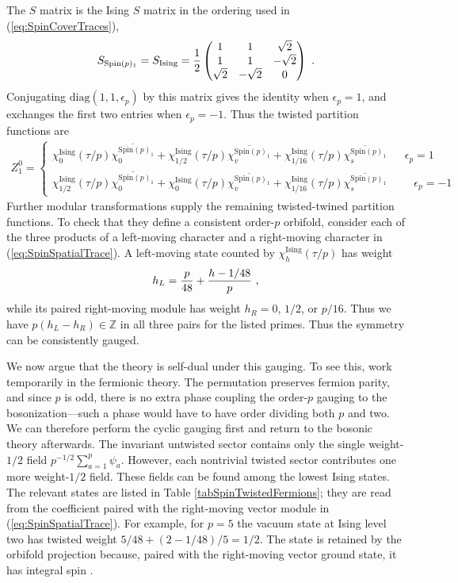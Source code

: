 \documentclass[12pt]{article}
\numberwithin{equation}{section}
\newcommand{\bea}{\begin{eqnarray}}
\newcommand{\eea}{\end{eqnarray}}
\def\ZZ{\mathbb{Z}}
\theoremstyle{remark}
\begin{document}
The $S$ matrix is the Ising $S$ matrix in the ordering used in (\ref{eq:SpinCoverTraces}),
\bea
S_{\mathrm{Spin}(p)_1}=S_{\mathrm{Ising}}
={1\over 2}\begin{pmatrix}1&1&\sqrt2\\1&1&-\sqrt2\\\sqrt2&-\sqrt2&0\end{pmatrix}~.
\eea
Conjugating $\mathrm{diag}(1,1,\epsilon_p)$ by this matrix gives the identity when $\epsilon_p=1$, and exchanges the first two entries when $\epsilon_p=-1$. Thus  the twisted partition functions are
\bea \label{eq:SpinSpatialTrace}
Z^0_1=\left\{ \begin{matrix}
 \chi^{\mathrm{Ising}}_0(\tau/p)\overline{\chi^{\mathrm{Spin}(p)_1}_0}+\chi^{\mathrm{Ising}}_{1/2}(\tau/p)\overline{\chi^{\mathrm{Spin}(p)_1}_{v}}+\chi^{\mathrm{Ising}}_{1/16}(\tau/p)\overline{\chi^{\mathrm{Spin}(p)_1}_{s}} && \epsilon_p = 1
 \\
\chi^{\mathrm{Ising}}_{1/2}(\tau/p)\overline{\chi^{\mathrm{Spin}(p)_1}_0}+\chi^{\mathrm{Ising}}_0(\tau/p)\overline{\chi^{\mathrm{Spin}(p)_1}_{v}}+\chi^{\mathrm{Ising}}_{1/16}(\tau/p)\overline{\chi^{\mathrm{Spin}(p)_1}_{s}}&& \,\,\,\,\,\epsilon_p = -1
\end{matrix} \right.\,\,\,\,
\eea
Further modular transformations supply the remaining twisted-twined partition functions. To check that they define a consistent order-$p$ orbifold, consider each of the three products of a left-moving character and a right-moving character in (\ref{eq:SpinSpatialTrace}). A left-moving state counted by $\chi^{\mathrm{Ising}}_h(\tau/p)$ has weight
\bea
h_L={p\over48}+{h-1/48\over p}~,
\eea
while its paired right-moving module has weight $h_R=0$, $1/2$, or $p/16$. Thus we have $p(h_L-h_R)\in\ZZ$ in all three pairs for the listed primes. 
Thus the symmetry can be consistently gauged.

We now argue that the theory is self-dual under this gauging. To see this, work temporarily in the fermionic theory. The permutation preserves fermion parity, and since $p$ is odd, there is no extra phase coupling the order-$p$ gauging to the bosonization---such a phase would have to have order dividing both $p$ and two. We can therefore perform the cyclic gauging first and return to the bosonic theory afterwards. The invariant untwisted sector contains only the single weight-$1/2$ field $p^{-1/2}\sum_{a=1}^p\psi_a$. However, each nontrivial twisted sector contributes one more weight-$1/2$ field. These fields can be found among the lowest Ising states. The relevant states are listed in Table \ref{tabSpinTwistedFermions}; they are read from the coefficient paired with the right-moving vector module in (\ref{eq:SpinSpatialTrace}). For example, for $p=5$ the vacuum state at Ising level two has twisted weight $5/48+(2-1/48)/5=1/2$. The state is retained by the orbifold projection because, paired with the right-moving vector ground state, it has integral spin \cite{Barron:2013tka}.
\end{document}
